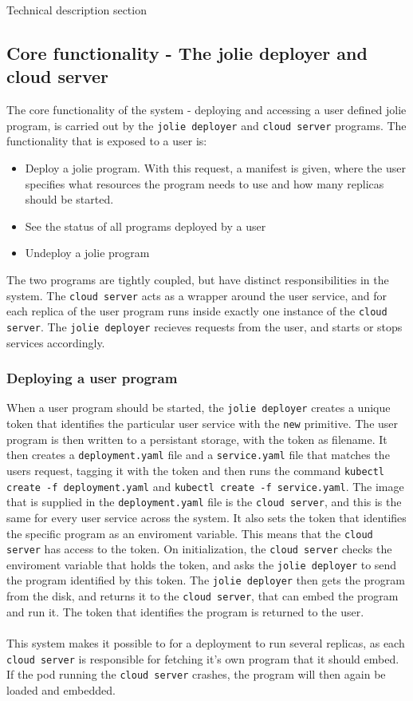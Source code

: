 \documentclass[Report.tex]{subfiles}
\begin{document}
Technical description section
\subsection{Core functionality - The jolie deployer and cloud server}
The core functionality of the system - deploying and accessing a user defined jolie program, is carried out by the {\tt jolie deployer} and {\tt cloud server} programs. The functionality that is exposed to a user is:
\begin{itemize}
\item Deploy a jolie program. With this request, a manifest is given, where the user specifies what resources the program needs to use and how many replicas should be started.
\item See the status of all programs deployed by a user
\item Undeploy a jolie program
\end{itemize}
The two programs are tightly coupled, but have distinct responsibilities in the system. The {\tt cloud server} acts as a wrapper around the user service, and for each replica of the user program runs inside exactly one instance of the {\tt cloud server}. The {\tt jolie deployer} recieves requests from the user, and starts or stops services accordingly.
\subsubsection{Deploying a user program}
When a user program should be started, the {\tt jolie deployer} creates a unique token that identifies the particular user service with the {\tt new} primitive. The user program is then written to a persistant storage, with the token as filename. It then creates a {\tt deployment.yaml} file and a {\tt service.yaml} file that matches the users request, tagging it with the token and then runs the command {\tt kubectl create -f deployment.yaml} and {\tt kubectl create -f service.yaml}. The image that is supplied in the {\tt deployment.yaml} file is the {\tt cloud server}, and this is the same for every user service across the system. It also sets the token that identifies the specific program as an enviroment variable. This means that the {\tt cloud server} has access to the token. On initialization, the {\tt cloud server} checks the enviroment variable that holds the token, and asks the {\tt jolie deployer} to send the program identified by this token. The {\tt jolie deployer} then gets the program from the disk, and returns it to the {\tt cloud server}, that can embed the program and run it. The token that identifies the program is returned to the user.
\\\\
This system makes it possible to for a deployment to run several replicas, as each {\tt cloud server} is responsible for fetching it's own program that it should embed. If the pod running the {\tt cloud server} crashes, the program will then again be loaded and embedded.
\end{document}
